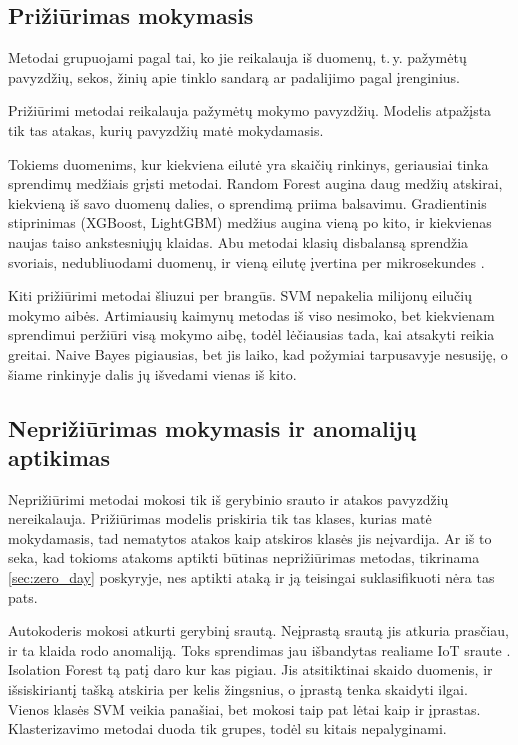 
\subsection{Prižiūrimas mokymasis}

Metodai grupuojami pagal tai, ko jie reikalauja iš duomenų, t.\,y.
pažymėtų pavyzdžių, sekos, žinių apie tinklo sandarą ar padalijimo pagal
įrenginius.

Prižiūrimi metodai reikalauja pažymėtų mokymo pavyzdžių. Modelis
atpažįsta tik tas atakas, kurių pavyzdžių matė mokydamasis.

Tokiems duomenims, kur kiekviena eilutė yra skaičių rinkinys, geriausiai
tinka sprendimų medžiais grįsti metodai. Random Forest augina daug
medžių atskirai, kiekvieną iš savo duomenų dalies, o sprendimą priima
balsavimu. Gradientinis stiprinimas (XGBoost, LightGBM) medžius augina
vieną po kito, ir kiekvienas naujas taiso ankstesniųjų klaidas. Abu metodai
klasių disbalansą sprendžia svoriais, nedubliuodami duomenų, ir vieną
eilutę įvertina per mikrosekundes \cite{almahaqeri2026gradient}.

Kiti prižiūrimi metodai šliuzui per brangūs. SVM nepakelia milijonų
eilučių mokymo aibės. Artimiausių kaimynų metodas iš viso nesimoko, bet
kiekvienam sprendimui peržiūri visą mokymo aibę, todėl lėčiausias tada,
kai atsakyti reikia greitai. Naive Bayes pigiausias, bet jis laiko, kad
požymiai tarpusavyje nesusiję, o šiame rinkinyje dalis jų išvedami
vienas iš kito.

\subsection{Neprižiūrimas mokymasis ir anomalijų aptikimas}

Neprižiūrimi metodai mokosi tik iš gerybinio srauto ir atakos pavyzdžių
nereikalauja. Prižiūrimas modelis priskiria tik tas klases, kurias matė
mokydamasis, tad nematytos atakos kaip atskiros klasės jis neįvardija.
Ar iš to seka, kad tokioms atakoms aptikti būtinas neprižiūrimas
metodas, tikrinama \ref{sec:zero_day} poskyryje, nes aptikti ataką ir
ją teisingai suklasifikuoti nėra tas pats.

Autokoderis mokosi atkurti gerybinį srautą. Neįprastą srautą jis atkuria
prasčiau, ir ta klaida rodo anomaliją. Toks sprendimas jau išbandytas
realiame IoT sraute \cite{meidan2018nbaiot}. Isolation Forest tą patį
daro kur kas pigiau. Jis atsitiktinai skaido duomenis, ir išsiskiriantį
tašką atskiria per kelis žingsnius, o įprastą tenka skaidyti ilgai.
Vienos klasės SVM veikia panašiai, bet mokosi taip pat lėtai kaip ir
įprastas. Klasterizavimo metodai duoda tik grupes, todėl su kitais
nepalyginami.


